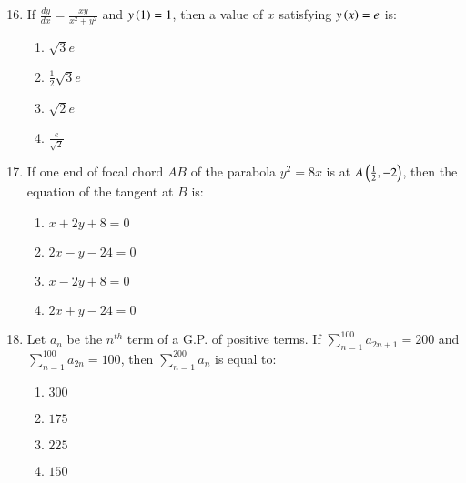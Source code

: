 \documentclass[journal]{IEEEtran}
\begin{document}
\begin{enumerate}\setcounter{enumi}{15}
    
    \item If $\frac{dy}{dx} = \frac{xy}{x^2+y^2}$ and $y\left(1\right)=1$, then a value of $x$ satisfying $y\left(x\right)=e$ is:
    \begin{multicols}{2} %
    \begin{enumerate}
        \item $\sqrt{3} e$\\
        \item $\frac{1}{2} \sqrt{3} e$
        \item $\sqrt{2}e$\\
        \item $\frac{e}{\sqrt{2}}$
    \end{enumerate}
    \end{multicols}

    \item If one end of focal chord $AB$ of the parabola $y^2 = 8x$ is at $A\left(\frac{1}{2},-2\right)$, then the equation of the tangent at $B$ is:
    \begin{multicols}{2}
    \begin{enumerate}
        \item $x+2y+8=0$
        \item $2x-y-24=0$
        \item $x-2y+8=0$
        \item $2x+y-24=0$
    \end{enumerate}
    \end{multicols}

    \item Let $a_n$ be the $n^{th}$ term of a G.P. of positive terms. If $\sum_{n=1}^{100} a_{2n+1} = 200$ and $\sum_{n=1}^{100}a_{2n} = 100$, then $\sum_{n=1}^{200}a_n$ is equal to:
    \begin{multicols}{2}
    \begin{enumerate}
        \item $300$\\
        \item $175$
        \item $225$\\
        \item $150$
    \end{enumerate}
    \end{multicols}


\end{enumerate}
\end{document}
